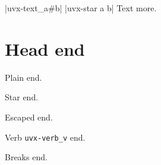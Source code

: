 \documentclass{article}
\begin{document}
\tableofcontents
{}|uvx-text_a#b|
|uvx-star a  b|
Text  more.

\section{Head  end}

Plain  end.

Star  end.

Escaped  end.

Verb \Verb|uvx-verb_v| end.

{Breaks  end.}
\end{document}
